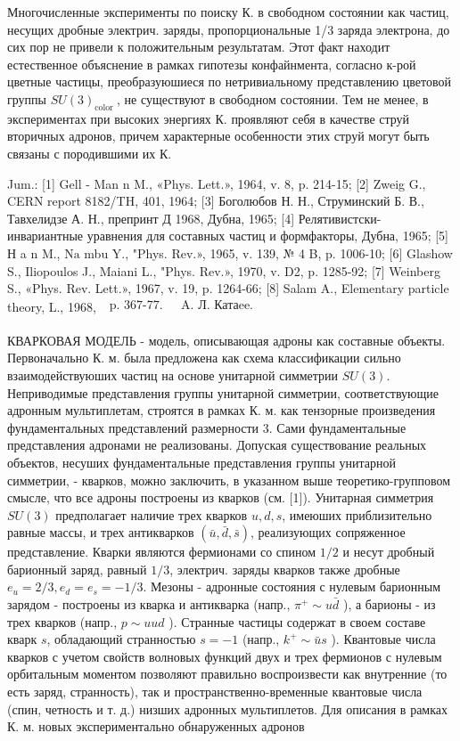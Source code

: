 \documentclass[10pt]{article}
\begin{document}
Многочисленные эксперименты по поиску К. в свободном состоянии как частиц, несущих дробные электрич. заряды, пропорциональные 1/3 заряда электрона, до сих пор не привели к положительным результатам. Этот факт находит естественное объяснение в рамках гипотезы конфайнмента, согласно к-рой цветные частицы, преобразуюшиеся по нетривиальному представлению цветовой группы $S U(3)_{\text {color }}$, не существуют в свободном состоянии. Тем не менее, в экспериментах при высоких энергиях К. проявляют себя в качестве струй вторичных адронов, причем характерные особенности этих струй могут быть связаны с породившими их К.



Jum.: [1] Gell - Man n M., «Phys. Lett.», 1964, v. 8, p. 214-15; [2] Zweig G., CERN report 8182/TH, 401, 1964; [3] Боголюбов Н. Н., Струминский Б. В., Тавхелидзе А. Н., препринт Д 1968, Дубна, 1965; [4] Релятивистски-инвариантные уравнения для составных частиц и формфакторы, Дубна, 1965; [5] Н a n M., $\mathrm{Na}$ mbu Y., "Phys. Rev.», 1965, v. 139, № 4 B, p. 1006-10; [6] Glashow S., Iliopoulos J., Maiani L., "Phys. Rev.», 1970, v. D2, p. 1285-92; [7] Weinberg S., «Phys. Rev. Lett.», 1967, v. 19, p. 1264-66; [8] Salam A., Elementary particle theory, L., 1968, $\begin{array}{ll}\text { p. 367-77. } & \text { A. Л. Катаee. } \\ & \end{array}$



КВАРКОВАЯ МОДЕЛЬ - модель, описывающая адроны как составные объекты. Первоначально К. м. была предложена как схема классификации сильно взаимодействуюших частиц на основе унитарной симметрии $S U(3)$. Неприводимые представления группы унитарной симметрии, соответствующие адронным мультиплетам, строятся в рамках К. м. как тензорные произведения фундаментальных представлений размерности 3. Сами фундаментальные представления адронами не реализованы. Допуская существование реальных объектов, несуших фундаментальные представления группы унитарной симметрии, - кварков, можно заключить, в указанном выше теоретико-групповом смысле, что все адроны построены из кварков (см. [1]). Унитарная симметрия $S U(3)$ предполагает наличие трех кварков $u, d, s$, имеюших приблизительно равные массы, и трех антикварков $(\bar{u}, \bar{d}, \bar{s})$, реализующих сопряженное представление. Кварки являются фермионами со спином $1 / 2$ и несут дробный барионный заряд, равный $1 / 3$, электрич. заряды кварков также дробные $e_{u}=2 / 3, e_{d}=e_{s}=-1 / 3$. Мезоны - адронные состояния с нулевым барионным зарядом - построены из кварка и антикварка (напр., $\pi^{+} \sim u \bar{d}$ ), а барионы - из трех кварков (напр., $p \sim u u d$ ). Странные частицы содержат в своем составе кварк $s$, обладающий странностью $s=-1$ (напр., $k^{+} \sim \bar{u} s$ ). Квантовые числа кварков с учетом свойств волновых функций двух и трех фермионов с нулевым орбитальным моментом позволяют правильно воспроизвести как внутренние (то есть заряд, странность), так и пространственно-временные квантовые числа (спин, четность и т. д.) низших адронных мультиплетов. Для описания в рамках К. м. новых экспериментально обнаруженных адронов
\end{document}
